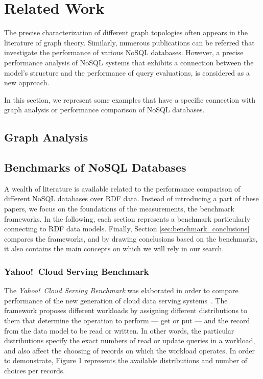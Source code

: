 \chapter{Related Work}

The precise characterization of different graph topologies often appears in the literature of graph theory. Similarly, numerous publications can be referred that investigate the performance of various NoSQL databases. However, a precise performance analysis of NoSQL systems that exhibits a connection between the model's structure and the performance of query evaluations, is considered as a new approach.

In this section, we represent some examples that have a specific connection with graph analysis or performance comparison of NoSQL databases.

\section{Graph Analysis}



\section{Benchmarks of NoSQL Databases}

A wealth of literature is available related to the performance comparison of different NoSQL databases over RDF data. Instead of introducing a part of these papers, we focus on the foundations of the measurements, the benchmark frameworks. In the following, each section represents a benchmark particularly connecting to RDF data models. Finally, Section \ref{sec:benchmark_conclusions} compares the frameworks, and by drawing conclusions based on the benchmarks, it also contains the main concepts on which we will rely in our search.

\subsection{Yahoo!~Cloud Serving Benchmark}

The \textit{Yahoo!~Cloud Serving Benchmark} was elaborated in order to compare performance of the new generation
of cloud data serving systems~\cite{ycsb}. The framework proposes different workloads by assigning
different distributions to them that determine the operation to perform --- get or put --- and the record from the data model to be read or written. In other words, the particular distributions specify the exact numbers of read or update queries in a workload, and also affect the choosing of records on which the workload operates. In order to demonstrate, Figure 1 %
represents the available distributions and number of choices per records.


